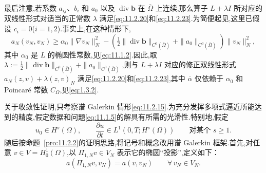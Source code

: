 最后注意,若系数 \(a_{ij}\)、\(b_i\) 和 \(a_0\) 以及 \(\operatorname{div}\boldsymbol{b}\) 在 \(\overline\Omega\) 上连续,那么算子 \(L+\lambda I\) 所对应的双线性形式对适当的正常数 \(\lambda\) 满足\eqref{eq:11.2.20}和\eqref{eq:11.2.23}.为简便起见,这里已假设 \(c_i=0\)(\(i=1,2\)).事实上,在这种情形下,
\[
  a_N(v_N,v_N)\ge\alpha_0\|\nabla v_N\|_N^2
    -\left(\tfrac12\|\operatorname{div}\boldsymbol{b}\|_{C^0(\overline\Omega)}
                  +\|a_0\|_{C^0(\overline\Omega)}\right)\|v_N\|_N^2,
\]
其中 \(\alpha_0\) 是 \(L\) 的椭圆性常数,见\eqref{eq:11.1.2}.因此,取 \(\lambda:=\tfrac12\|\operatorname{div}\boldsymbol{b}\|_{C^0(\overline\Omega)}+\|a_0\|_{C^0(\overline\Omega)}\),则与 \(L+\lambda I\) 对应的修正双线性形式 \(a_N(z,v)+\lambda(z,v)_N\) 满足\eqref{eq:11.2.20}和\eqref{eq:11.2.23},其中 \(\overline\alpha\) 仅依赖于 \(\alpha_0\) 和 Poincaré 常数 \(C_\Omega\),见\eqref{eq:1.3.2}.

关于收敛性证明,只考察谱 Galerkin 情形\eqref{eq:11.2.15}.为充分发挥多项式逼近所能达到的精度,假定数据和问题\eqref{eq:11.1.5}的解具有所需的光滑性.特别地,假定
\begin{equation}\label{eq:11.2.25}
  u_0\in H^s(\Omega),\qquad
  \frac{\partial u}{\partial t}\in L^1(0,T;H^s(\Omega))
         \qquad\text{对某个 }s\ge1.
\end{equation}
随后按命题~\ref{pro:11.2.2}的证明思路,将记号和概念改用谱 Galerkin 框架.首先,对任意 \(v\in V=H_0^1(\Omega)\),以 \(\Pi_{1,N}v\in V_N\) 表示它的椭圆“投影”,定义如下：
\begin{equation}\label{eq:11.2.26}
  a(\Pi_{1,N}v,v_N)=a(v,v_N)\qquad\forall\,v_N\in V_N.
\end{equation}

